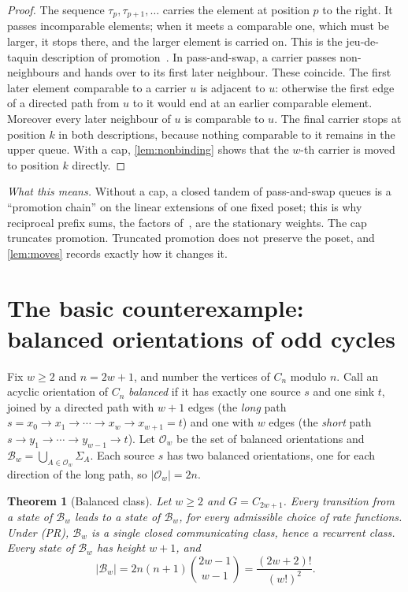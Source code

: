 \documentclass[11pt,a4paper]{article}
\newtheorem{theorem}{Theorem}[section]
\theoremstyle{plain}
\theoremstyle{plain}
\newcommand{\Bal}{\mathcal{B}}
\newcommand{\Obal}{\mathcal{O}}
\newcommand{\Sg}{\Sigma}
\newcommand{\what}[1]{\par\smallskip\noindent\textit{What this means.} #1\par\smallskip}
\begin{document}
\begin{proof}
The sequence $\tau_p,\tau_{p+1},\dots$ carries the element at position $p$ to the right. It passes incomparable elements; when it meets a comparable one, which must be larger, it stops there, and the larger element is carried on. This is the jeu-de-taquin description of promotion~\cite{Sta2009}. In pass-and-swap, a carrier passes non-neighbours and hands over to its first later neighbour. These coincide. The first later element comparable to a carrier $u$ is adjacent to $u$: otherwise the first edge of a directed path from $u$ to it would end at an earlier comparable element. Moreover every later neighbour of $u$ is comparable to $u$. The final carrier stops at position $k$ in both descriptions, because nothing comparable to it remains in the upper queue. With a cap, \cref{lem:nonbinding} shows that the $w$-th carrier is moved to position $k$ directly.
\end{proof}

\what{Without a cap, a closed tandem of pass-and-swap queues is a ``promotion chain'' on the linear extensions of one fixed poset; this is why reciprocal prefix sums, the factors of~\cite[Theorem~4.5]{AKS2014}, are the stationary weights. The cap truncates promotion. Truncated promotion does not preserve the poset, and \cref{lem:moves} records exactly how it changes it.}

\section{The basic counterexample: balanced orientations of odd cycles}\label{sec:oddcycle}

Fix $w\ge2$ and $n=2w+1$, and number the vertices of $C_n$ modulo $n$. Call an acyclic orientation of $C_n$ \emph{balanced} if it has exactly one source $s$ and one sink $t$, joined by a directed path with $w+1$ edges (the \emph{long} path $s=x_0\to x_1\to\cdots\to x_w\to x_{w+1}=t$) and one with $w$ edges (the \emph{short} path $s\to y_1\to\cdots\to y_{w-1}\to t$). Let $\Obal_w$ be the set of balanced orientations and $\Bal_w=\bigcup_{A\in\Obal_w}\Sg_A$. Each source $s$ has two balanced orientations, one for each direction of the long path, so $|\Obal_w|=2n$.

\begin{theorem}[Balanced class]\label{thm:balanced}
Let $w\ge2$ and $G=C_{2w+1}$. Every transition from a state of $\Bal_w$ leads to a state of $\Bal_w$, for every admissible choice of rate functions. Under (PR), $\Bal_w$ is a single closed communicating class, hence a recurrent class. Every state of $\Bal_w$ has height $w+1$, and
\[
 |\Bal_w| = 2n(n+1)\binom{2w-1}{w-1} = \frac{(2w+2)!}{(w!)^2}.
\]
\end{theorem}
\end{document}
